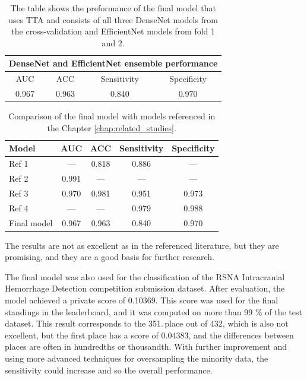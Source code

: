 \documentclass[thesis=B,english]{FITthesis}[2019/12/23]
\begin{document}
\begin{table}[ht]
    \centering
        \begin{tabular}{ |c|c|c|c|  }
         \hline
         \multicolumn{4}{|c|}{DenseNet and EfficientNet ensemble performance} \\
         \hline
         \hline
         AUC & ACC & Sensitivity & Specificity\\
         \hline
         0.967 & 0.963 & 0.840 & 0.970\\
         \hline
        \end{tabular}
    \caption{The table shows the preformance of the final model that uses TTA and consists of all three DenseNet models from the cross-validation and EfficientNet models from fold 1 and 2. }
    \label{tab:final_ensemble_performance}
\end{table}

\begin{table}[ht]
    \centering
        \begin{tabular}{ |p{2.5cm}||c|c|c|c|  }
         \hline
         Model & AUC & ACC & Sensitivity & Specificity\\
         \hline
         \hline
         Ref 1 \cite{DBLP:1710-04934} & --- & 0.818 & 0.886 & ---\\
         Ref 2 \cite{Kuo22737}        & 0.991 & --- & --- & ---\\
         Ref 3 \cite{Chang1609}       & 0.970 & 0.981 & 0.951 & 0.973\\
         Ref 4 \cite{Cho2019}         & --- & --- & 0.979 & 0.988\\
         Final model                  & 0.967 & 0.963 & 0.840 & 0.970\\
         \hline
        \end{tabular}
    \caption{Comparison of the final model with models referenced in the Chapter \ref{chap:related_studies}.}
    \label{tab:ref_models_comparison}
\end{table}

The results are not as excellent as in the referenced literature, but they are promising, and they are a good basis for further research. 

The final model was also used for the classification of the RSNA Intracranial Hemorrhage Detection competition submission dataset. After evaluation, the model achieved a private score of 0.10369. This score was used for the final standings in the leaderboard, and it was computed on more than 99 \% of the test dataset. This result corresponds to the 351.\,place out of 432, which is also not excellent, but the first place has a score of 0.04383, and the differences between places are often in hundredths or thousandth. With further improvement and using more advanced techniques for oversampling the minority data, the sensitivity could increase and so the overall performance.
\end{document}
